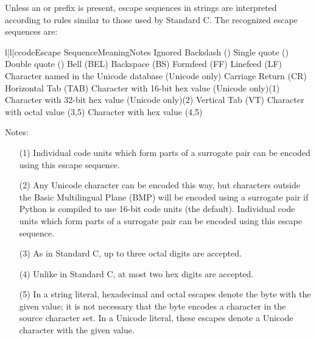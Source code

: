 Unless an  or  prefix is present, escape
sequences in strings are interpreted according to rules similar
to those used by Standard C.  The recognized escape sequences are:

\begin{tableiii}{l|l|c}{code}{Escape Sequence}{Meaning}{Notes}
 {Ignored}{}
\lineiii{\e\e}	{Backslash (\code{\e})}{}
	{Single quote ()}{}
	{Double quote ()}{}
	{\ASCII{} Bell (BEL)}{}
	{\ASCII{} Backspace (BS)}{}
	{\ASCII{} Formfeed (FF)}{}
	{\ASCII{} Linefeed (LF)}{}
        {Character named  in the Unicode database (Unicode only)}{}
	{\ASCII{} Carriage Return (CR)}{}
	{\ASCII{} Horizontal Tab (TAB)}{}
        {Character with 16-bit hex value  (Unicode only)}{(1)}
        {Character with 32-bit hex value  (Unicode only)}{(2)}
	{\ASCII{} Vertical Tab (VT)}{}
 {Character with octal value }{(3,5)}
 {Character with hex value }{(4,5)}
\end{tableiii}

\noindent
Notes:

\begin{itemize}
\item[(1)]
  Individual code units which form parts of a surrogate pair can be
  encoded using this escape sequence.
\item[(2)]
  Any Unicode character can be encoded this way, but characters
  outside the Basic Multilingual Plane (BMP) will be encoded using a
  surrogate pair if Python is compiled to use 16-bit code units (the
  default).  Individual code units which form parts of a surrogate
  pair can be encoded using this escape sequence.
\item[(3)]
  As in Standard C, up to three octal digits are accepted.
\item[(4)]
  Unlike in Standard C, at most two hex digits are accepted.
\item[(5)]
  In a string literal, hexadecimal and octal escapes denote the
  byte with the given value; it is not necessary that the byte
  encodes a character in the source character set. In a Unicode
  literal, these escapes denote a Unicode character with the given
  value.
\end{itemize}


